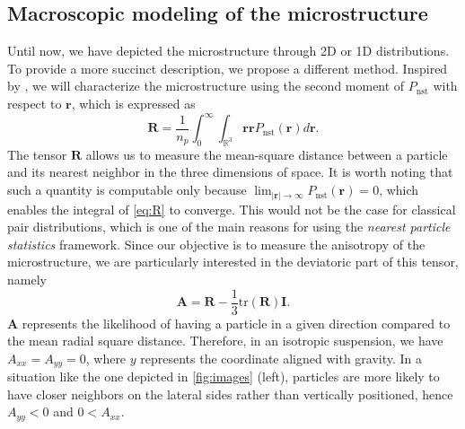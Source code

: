 \subsection{Macroscopic modeling of the microstructure}
Until now, we have depicted the microstructure through 2D or 1D distributions. To provide a more succinct description, we propose a different method. Inspired by \citet{zhang2023evolution}, we will characterize the microstructure using the second moment of $P_\text{nst}$ with respect to $\mathbf{r}$, which is expressed as
\begin{equation}
    \textbf{R} =\frac{1}{n_p} 
    \int_0^\infty 
    \int_{\mathbb{R}^3} \textbf{rr} P_\text{nst}(\textbf{r}) d\textbf{r}.
    \label{eq:R}
\end{equation}
The tensor $\textbf{R}$ allows us to measure the mean-square distance between a particle and its nearest neighbor in the three dimensions of space.
It is worth noting that such a quantity is computable only because $\lim_{|\textbf{r}|\to \infty} P_\text{nst}(\textbf{r}) = 0$, which enables the integral of \ref{eq:R} to converge. 
This would not be the case for classical pair distributions, which is one of the main reasons for using the \textit{nearest particle statistics} framework. Since our objective is to measure the anisotropy of the microstructure, we are particularly interested in the deviatoric part of this tensor, namely
\begin{equation*}
    \textbf{A} = \textbf{R} - \frac{1}{3}  \text{tr}(\textbf{R}) \textbf{I}.
\end{equation*}
$\textbf{A}$ represents the likelihood of having a particle in a given direction compared to the mean radial square distance. 
Therefore, in an isotropic suspension, we have $A_{xx} = A_{yy} = 0$, where $y$ represents the coordinate aligned with gravity. 
In a situation like the one depicted in \ref{fig:images} (left), particles are more likely to have closer neighbors on the lateral sides rather than vertically positioned, hence  $A_{yy} < 0$ and $0 < A_{xx}$. 


